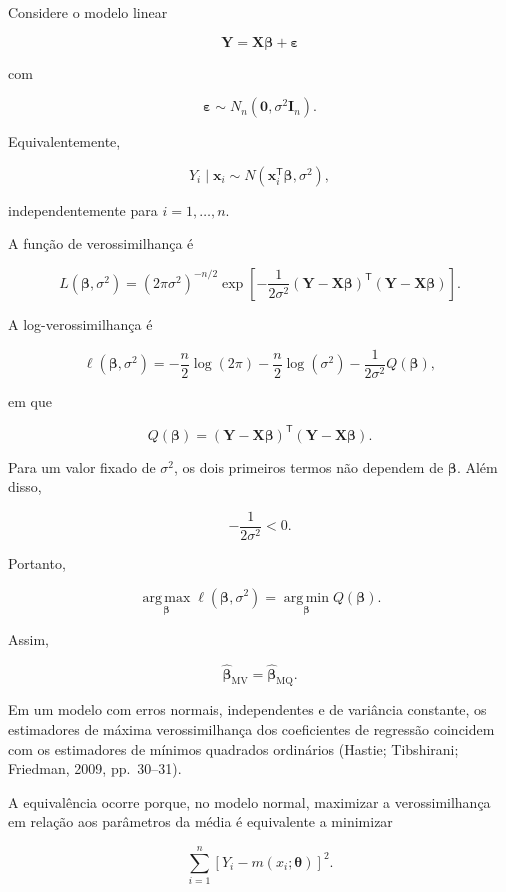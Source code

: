 \documentclass[
  letterpaper,
  DIV=11,
  numbers=noendperiod]{scrreprt}
\begin{document}
Considere o modelo linear

\[\mathbf{Y}
=
\mathbf{X}\boldsymbol\beta
+
\boldsymbol\varepsilon\]

com

\[\boldsymbol\varepsilon
\sim
N_n
\left(
\mathbf{0},
\sigma^2\mathbf{I}_n
\right).\]

Equivalentemente,

\[Y_i\mid\mathbf{x}_i
\sim
N
\left(
\mathbf{x}_i^\mathsf{T}\boldsymbol\beta,
\sigma^2
\right),\]

independentemente para \(i=1,\ldots,n\).

A função de verossimilhança é

\[L(\boldsymbol\beta,\sigma^2)
=
(2\pi\sigma^2)^{-n/2}
\exp
\left[
-\frac{1}{2\sigma^2}
(\mathbf{Y}-\mathbf{X}\boldsymbol\beta)^\mathsf{T}
(\mathbf{Y}-\mathbf{X}\boldsymbol\beta)
\right].\]

A log-verossimilhança é

\[\ell(\boldsymbol\beta,\sigma^2)
=
-\frac{n}{2}\log(2\pi)
-\frac{n}{2}\log(\sigma^2)
-\frac{1}{2\sigma^2}
Q(\boldsymbol\beta),\]

em que

\[Q(\boldsymbol\beta)
=
(\mathbf{Y}-\mathbf{X}\boldsymbol\beta)^\mathsf{T}
(\mathbf{Y}-\mathbf{X}\boldsymbol\beta).\]

Para um valor fixado de \(\sigma^2\), os dois primeiros termos não
dependem de \(\boldsymbol\beta\). Além disso,

\[-\frac{1}{2\sigma^2}<0.\]

Portanto,

\[\operatorname*{arg\,max}_{\boldsymbol\beta}
\ell(\boldsymbol\beta,\sigma^2)
=
\operatorname*{arg\,min}_{\boldsymbol\beta}
Q(\boldsymbol\beta).\]

Assim,

\[\boxed{
\widehat{\boldsymbol\beta}_{\mathrm{MV}}
=
\widehat{\boldsymbol\beta}_{\mathrm{MQ}}
}.\]

Em um modelo com erros normais, independentes e de variância constante,
os estimadores de máxima verossimilhança dos coeficientes de regressão
coincidem com os estimadores de mínimos quadrados ordinários (Hastie;
Tibshirani; Friedman, 2009, pp.~30--31).

\begin{tcolorbox}[enhanced jigsaw, colback=white, leftrule=.75mm, colbacktitle=quarto-callout-important-color!10!white, breakable, titlerule=0mm, bottomtitle=1mm, title=\textcolor{quarto-callout-important-color}{\faExclamation}\hspace{0.5em}{Resultado}, colframe=quarto-callout-important-color-frame, toprule=.15mm, opacityback=0, bottomrule=.15mm, opacitybacktitle=0.6, arc=.35mm, toptitle=1mm, rightrule=.15mm, coltitle=black, left=2mm]

A equivalência ocorre porque, no modelo normal, maximizar a
verossimilhança em relação aos parâmetros da média é equivalente a
minimizar

\[\sum_{i=1}^n
\left[
Y_i-m(x_i;\boldsymbol\theta)
\right]^2.\]

\end{tcolorbox}
\end{document}
